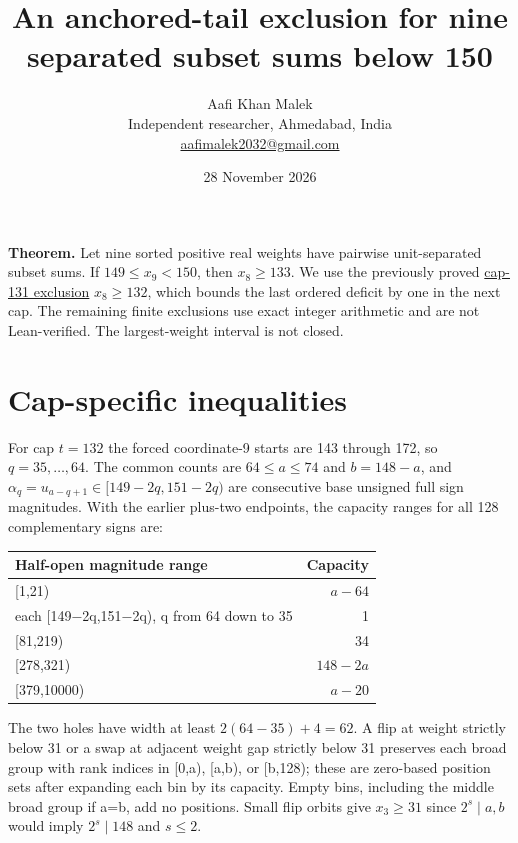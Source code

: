 \documentclass[11pt,letterpaper]{article}
\title{An anchored-tail exclusion for nine separated subset sums below 150}
\author{Aafi Khan Malek\\ \small Independent researcher, Ahmedabad, India\\
\small\href{mailto:aafimalek2032@gmail.com}{aafimalek2032@gmail.com}}
\date{28 November 2026}
\begin{document}
\maketitle
\textbf{Theorem.} Let nine sorted positive real weights have pairwise
unit-separated subset sums. If \(149\le x_9<150\), then \(x_8\ge133\).
We use the previously proved
\href{https://github.com/Aafimalek/novel-discoveries/tree/1fdefaee1c13f9315b29c352b7bba3231b48585d/nine-separated-subset-sums/verification/rank-cuts-below-150/penultimate-cap-131}{cap-131 exclusion}
\(x_8\ge132\), which bounds the last ordered deficit by one in the
next cap. The remaining finite exclusions use exact integer arithmetic
and are not Lean-verified. The largest-weight interval is not closed.

\section{Cap-specific inequalities}\label{cap-specific-inequalities}

For cap \(t=132\) the forced coordinate-9 starts are 143 through 172, so
\(q=35,\dots,64\). The common counts are \(64\le a\le74\) and
\(b=148-a\), and \(\alpha_q=u_{a-q+1}\in[149-2q,151-2q)\) are
consecutive base unsigned full sign magnitudes. With the earlier
plus-two endpoints, the capacity ranges for all 128 complementary signs
are:

\begin{longtable}[]{@{}lr@{}}
\toprule\noalign{}
Half-open magnitude range & Capacity \\
\midrule\noalign{}
\endhead
\bottomrule\noalign{}
\endlastfoot
{[}1,21) & \(a-64\) \\
each {[}149−2q,151−2q), q from 64 down to 35 & 1 \\
{[}81,219) & 34 \\
{[}278,321) & \(148-2a\) \\
{[}379,10000) & \(a-20\) \\
\end{longtable}

The two holes have width at least \(2(64-35)+4=62\). A flip at weight
strictly below 31 or a swap at adjacent weight gap strictly below 31
preserves each broad group with rank indices in {[}0,a), {[}a,b), or
{[}b,128); these are zero-based position sets after expanding each bin
by its capacity. Empty bins, including the middle broad group if a=b,
add no positions. Small flip orbits give \(x_3\ge31\) since
\(2^s\mid a,b\) would imply \(2^s\mid148\) and \(s\le2\).
\end{document}
